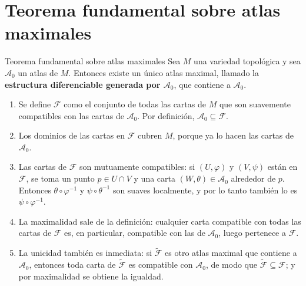 \section{Teorema fundamental sobre atlas maximales}
\begin{booktheorem}{Teorema fundamental sobre atlas maximales}
Sea $M$ una variedad topológica y sea $\mathcal{A}_0$ un atlas de $M$. Entonces existe un único atlas maximal, llamado la \textbf{estructura diferenciable generada por $\mathcal{A}_0$}, que contiene a $\mathcal{A}_0$.

\end{booktheorem}
\begin{bookproof}{}
\begin{enumerate}
\item Se define $\mathcal{F}$ como el conjunto de todas las cartas de $M$ que son suavemente compatibles con las cartas de $\mathcal{A}_0$. Por definición, $\mathcal{A}_0\subseteq\mathcal{F}$.
\item Los dominios de las cartas en $\mathcal{F}$ cubren $M$, porque ya lo hacen las cartas de $\mathcal{A}_0$.
\item Las cartas de $\mathcal{F}$ son mutuamente compatibles: si $(U,\varphi)$ y $(V,\psi)$ están en $\mathcal{F}$, se toma un punto $p\in U\cap V$ y una carta $(W,\theta)\in\mathcal{A}_0$ alrededor de $p$. Entonces $\theta\circ\varphi^{-1}$ y $\psi\circ\theta^{-1}$ son suaves localmente, y por lo tanto también lo es $\psi\circ\varphi^{-1}$.
\item La maximalidad sale de la definición: cualquier carta compatible con todas las cartas de $\mathcal{F}$ es, en particular, compatible con las de $\mathcal{A}_0$, luego pertenece a $\mathcal{F}$.
\item La unicidad también es inmediata: si $\widetilde{\mathcal{F}}$ es otro atlas maximal que contiene a $\mathcal{A}_0$, entonces toda carta de $\widetilde{\mathcal{F}}$ es compatible con $\mathcal{A}_0$, de modo que $\widetilde{\mathcal{F}}\subseteq\mathcal{F}$; y por maximalidad se obtiene la igualdad.
\end{enumerate}
\bookqed
\end{bookproof}
